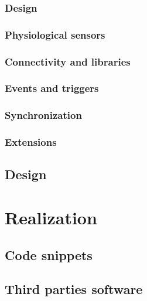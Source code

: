 \documentclass[binding=0.6cm,LaM]{sapthesis}
\begin{document}
\subsection{Design}



\subsection{Physiological sensors}

\subsection{Connectivity and libraries}

\subsection{Events and triggers}

\subsection{Synchronization}

\subsection{Extensions}



\section{Design}



\chapter{Realization}
\section{Code snippets}

\section{Third parties software}
\end{document}
